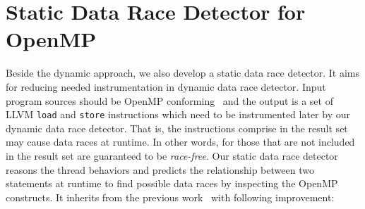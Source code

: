 \chapter{Static Data Race Detector for OpenMP}
\label{c:static}

\newcommand\dnode[2]{\textit{#1\textsubscript{#2}}}
\newcommand\ompdnode[1]{\dnode{#1}{omp}}
\newcommand\ompdnodehead[1]{\ompdnode{#1}\textit{ head}}
\newcommand\ompdnodetail[1]{\ompdnode{#1}\textit{ tail}}
\newcommand\mhpgdnode[1]{\dnode{#1}{mhpg}}
\newcommand\mhpgdnodehead[1]{\mhpgdnode{#1}\textit{ head}}
\newcommand\mhpgdnodetail[1]{\mhpgdnode{#1}\textit{ tail}}

Beside the dynamic approach, we also develop a static data race detector. It aims for reducing needed instrumentation in dynamic data race detector. Input program sources should be OpenMP conforming~\cite{OpenMP30Spec} and the output is a set of LLVM \verb|load| and \verb|store| instructions which need to be instrumented later by our dynamic data race detector. That is, the instructions comprise in the result set may cause data races at runtime. In other words, for those that are not included in the result set are guaranteed to be \textit{race-free}. Our static data race detector reasons the thread behaviors and predicts the relationship between two statements at runtime to find possible data races by inspecting the OpenMP constructs. It inherits from the previous work~\cite{WuJay:2009p1241} with following improvement:
